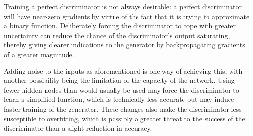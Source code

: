 \documentclass[../../main.tex]{subfiles}
\begin{document}
Training a perfect discriminator is not always desirable: a perfect discriminator will have near-zero gradients by virtue of the fact that it is trying to approximate a binary function.
Deliberately forcing the discriminator to cope with greater uncertainty can reduce the chance of the discriminator's output saturating, thereby giving clearer indications to the generator by backpropagating gradients of a greater magnitude.

Adding noise to the inputs as aforementioned is one way of achieving this, with another possibility being the limitation of the capacity of the network.
Using fewer hidden nodes than would usually be used may force the discriminator to learn a simplified function, which is technically less accurate but may induce faster training of the generator.
These changes also make the discriminator less susceptible to overfitting, which is possibly a greater threat to the success of the discriminator than a slight reduction in accuracy.
\end{document}

